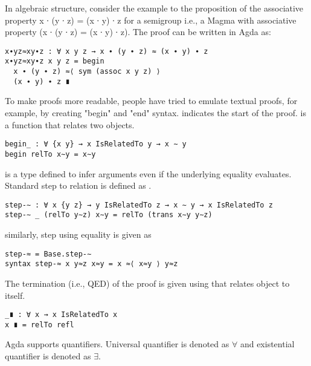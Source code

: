 In algebraic structure, consider the example to the proposition of the
associative property x ∙ (y ∙ z) = (x ∙ y) ∙ z  for a semigroup i.e., a Magma
with associative property (x ∙ (y ∙ z) = (x ∙ y) ∙ z). The proof can be written
in Agda as:
\begin{verbatim}
x∙yz≈xy∙z : ∀ x y z → x ∙ (y ∙ z) ≈ (x ∙ y) ∙ z
x∙yz≈xy∙z x y z = begin 
  x ∙ (y ∙ z) ≈⟨ sym (assoc x y z) ⟩ 
  (x ∙ y) ∙ z ∎
\end{verbatim}
To make proofs more readable, people have tried to emulate textual proofs, for
example, by creating "begin" and "end" syntax.  indicates the start
of the proof.  is a function that relates two objects.
\begin{verbatim}
begin_ : ∀ {x y} → x IsRelatedTo y → x ∼ y
begin relTo x∼y = x∼y
\end{verbatim}
 is a type defined to infer arguments even if the underlying equality
evaluates. Standard step to relation is defined as .
\begin{verbatim}
step-∼ : ∀ x {y z} → y IsRelatedTo z → x ∼ y → x IsRelatedTo z
step-∼ _ (relTo y∼z) x∼y = relTo (trans x∼y y∼z)
\end{verbatim}
similarly, step using equality is given as
\begin{verbatim}
step-≈ = Base.step-∼
syntax step-≈ x y≈z x≈y = x ≈⟨ x≈y ⟩ y≈z
\end{verbatim}
The termination (i.e., QED) of the proof is given using  that relates object to itself.
\begin{verbatim}
_∎ : ∀ x → x IsRelatedTo x
x ∎ = relTo refl
\end{verbatim}
Agda supports quantifiers. Universal quantifier is denoted as \(\forall\) and
existential quantifier is denoted as \(\exists\).

